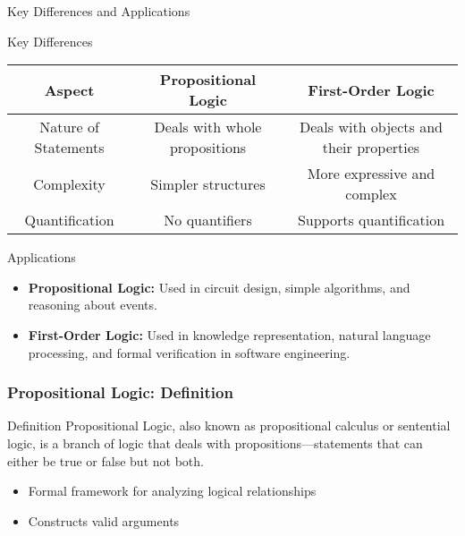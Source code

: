 \documentclass[aspectratio=169]{beamer}
\begin{document}
\begin{frame}[fragile]{Key Differences and Applications}
\begin{block}{Key Differences}
\begin{tabular}{|c|c|c|}
\hline
Aspect                  & Propositional Logic          & First-Order Logic               \\
\hline
Nature of Statements    & Deals with whole propositions & Deals with objects and their properties \\
Complexity             & Simpler structures           & More expressive and complex      \\
Quantification         & No quantifiers               & Supports quantification         \\
\hline
\end{tabular}
\end{block}

\begin{block}{Applications}
\begin{itemize}
    \item \textbf{Propositional Logic:} Used in circuit design, simple algorithms, and reasoning about events.
    \item \textbf{First-Order Logic:} Used in knowledge representation, natural language processing, and formal verification in software engineering.
\end{itemize}
\end{block}
\end{frame}

\begin{frame}[fragile]
    \frametitle{Propositional Logic: Definition}
    
    \begin{block}{Definition}
        Propositional Logic, also known as propositional calculus or sentential logic, is a branch of logic that deals with propositions—statements that can either be true or false but not both.
    \end{block}
    
    \begin{itemize}
        \item Formal framework for analyzing logical relationships
        \item Constructs valid arguments
    \end{itemize}
\end{frame}
\end{document}

